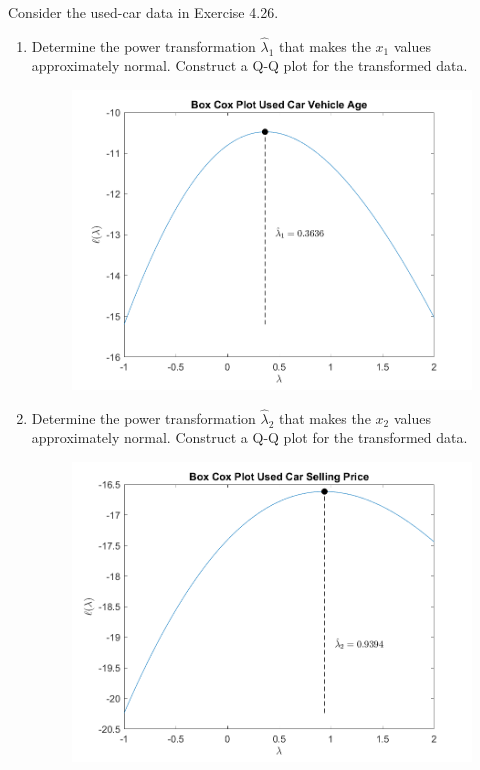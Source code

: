Consider the used-car data in Exercise 4.26.
\begin{enumerate}[label= (\alph*)]
    \item Determine the power transformation $\hat{\lambda}_{1}$ that makes the $x_{1}$ values approximately normal. Construct a Q-Q plot for the transformed data.
    
    \begin{figure}[H]
        \includegraphics[scale=0.8]{./matlab/chapter-4/sol4.30a.png}
    \end{figure}

    \item Determine the power transformation $\hat{\lambda}_{2}$ that makes the $x_{2}$ values approximately normal. Construct a Q-Q plot for the transformed data.
    
    \begin{figure}[H]
        \includegraphics[scale=0.8]{./matlab/chapter-4/sol4.30b.png}
    \end{figure}


\end{enumerate}
